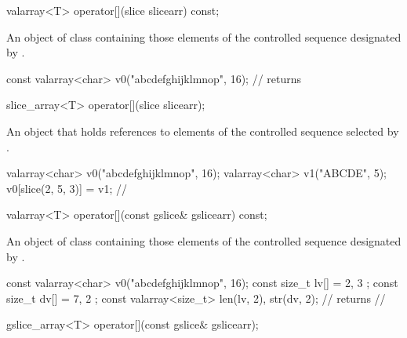 %
\begin{itemdecl}
valarray<T> operator[](slice slicearr) const;
\end{itemdecl}

\begin{itemdescr}
\pnum
\returns An object of class  containing those
elements of the controlled sequence designated by .
\enterexample
\begin{codeblock}
const valarray<char> v0("abcdefghijklmnop", 16);
//  returns 
\end{codeblock}
\exitexample
\end{itemdescr}

%
\begin{itemdecl}
slice_array<T> operator[](slice slicearr);
\end{itemdecl}

\begin{itemdescr}
\pnum
\returns An object that holds references to elements of the controlled
sequence selected by . \enterexample
\begin{codeblock}
valarray<char> v0("abcdefghijklmnop", 16);
valarray<char> v1("ABCDE", 5);
v0[slice(2, 5, 3)] = v1;
// 
\end{codeblock}
\exitexample
\end{itemdescr}

%
\begin{itemdecl}
valarray<T> operator[](const gslice& gslicearr) const;
\end{itemdecl}

\begin{itemdescr}
\pnum
\returns An object of class  containing those
elements of the controlled sequence designated by .
\enterexample
\begin{codeblock}
const valarray<char> v0("abcdefghijklmnop", 16);
const size_t lv[] = { 2, 3 };
const size_t dv[] = { 7, 2 };
const valarray<size_t> len(lv, 2), str(dv, 2);
//  returns
// 
\end{codeblock}
\exitexample
\end{itemdescr}

%
\begin{itemdecl}
gslice_array<T> operator[](const gslice& gslicearr);
\end{itemdecl}

